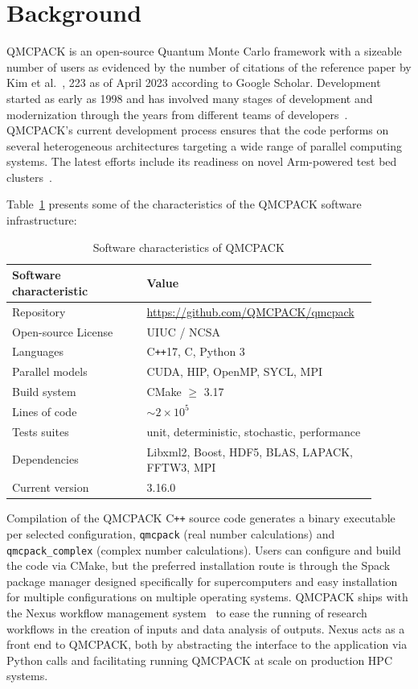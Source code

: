 
\section{Background}
\label{sec:Background}

QMCPACK is an open-source Quantum Monte Carlo framework with a sizeable number of users as evidenced by the number of
citations of the reference paper by Kim et al.~\cite{kim2018qmcpack}, 223 as of April 2023 according to Google Scholar.
Development
started as early as 1998 and has involved many stages of development and modernization through the years from different teams of developers~\cite{doi:10.1063/5.0004860}. QMCPACK's current development process ensures that the code performs on several heterogeneous architectures targeting a wide range of parallel computing systems. The latest efforts include its readiness on novel Arm-powered test bed clusters~\cite{10.1145/3581576.3581621}.

Table~\ref{tab:software} presents some of the characteristics of the QMCPACK software infrastructure:

\begin{table}[!ht]
\centering
\caption{Software characteristics of QMCPACK}
\begin{tabular}{| p{0.35\linewidth} | p{0.55\linewidth}|}
\hline
Software characteristic  & Value \\
\hline
Repository           & \url{https://github.com/QMCPACK/qmcpack} \\ 
Open-source License  & UIUC / NCSA \\
Languages            & C\texttt{++}17, C, Python 3 \\
Parallel models      & CUDA, HIP, OpenMP, SYCL, MPI \\
Build system         & CMake $\geq$ 3.17 \\ 
Lines of code        &  $\sim 2\times10^5$       \\
Tests suites         & unit, deterministic, stochastic, performance \\
Dependencies         & Libxml2, Boost, HDF5, BLAS, LAPACK, FFTW3, MPI \\ 
Current version      & 3.16.0 \\
\hline
\end{tabular}
\label{tab:software}
\end{table}

Compilation of the QMCPACK C\texttt{++} source code generates a binary executable per selected configuration, \texttt{qmcpack} (real number calculations) and
\texttt{qmcpack\_complex} (complex number calculations). Users can configure and build the code via CMake, but the preferred installation route is through the 
Spack~\cite{gamblin2015spack} package manager designed specifically for supercomputers and easy installation for multiple configurations on multiple operating systems. QMCPACK ships with the Nexus workflow management system~\cite{KROGEL2016154} to ease the running of research workflows in the
creation of inputs and data analysis of outputs. Nexus acts as a front end to QMCPACK, both by abstracting the interface to the application via Python calls and facilitating running QMCPACK at scale on production HPC systems.

